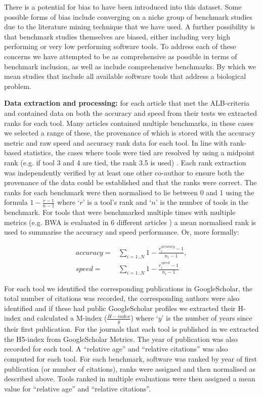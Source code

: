 \documentclass[fleqn,10pt]{SelfArx} %
\begin{document}
There is a potential for bias to have been introduced into this
dataset. Some possible forms of bias include converging on a niche
group of benchmark studies due to the literature mining technique that
we have used. A further possibility is that benchmark studies
themselves are biased, either including very high performing or very
low performing software tools. To address each of these concerns we
have attempted to be as comprehensive as possible in terms of
benchmark inclusion, as well as include comprehensive benchmarks. By
which we mean studies that include all available software tools that
address a biological problem.

\textbf{Data extraction and processing:} for each article that met the
ALB-criteria and contained data on both the accuracy and speed from
their tests we extracted ranks for each tool. Many articles contained
multiple benchmarks, in these cases we selected a range of these, the
provenance of which is stored with the accuracy metric and raw speed
and accuracy rank data for each tool. In line with rank-based
statistics, the cases where tools were tied are resolved by using a
midpoint rank (e.g. if tool 3 and 4 are tied, the rank 3.5 is used)
\cite{Mann1947-re}. Each rank extraction was independently verified by
at least one other co-author to ensure both the provenance of the data
could be established and that the ranks were correct. The ranks for
each benchmark were then normalised to lie between 0 and 1 using the
formula $1-\frac{r-1}{n-1}$ where ‘$r$’ is a tool’s rank and ‘$n$’ is the
number of tools in the benchmark. For tools that were benchmarked
multiple times with multiple metrics (e.g. BWA is evaluated in 6
different articles
\cite{Bao2011-lv,Caboche2014-lj,Hatem2013-cs,Schbath2012-ob,Ruffalo2011-rl,Holtgrewe2011-fd})
a mean normalised rank is used to summarise the accuracy and speed performance. 
Or, more formally:
 
\begin{equation*}
\begin{split}
accuracy =& \sum_{i=1..N} 1-\frac{r^{accuracy}_i-1}{n_i-1}, \\
speed    =& \sum_{i=1..N} 1-\frac{r^{speed   }_i-1}{n_i-1}
\end{split}
\end{equation*}
 
For each tool we identified the corresponding publications in
GoogleScholar, the total number of citations was recorded, the
corresponding authors were also identified and if these had public
GoogleScholar profiles we extracted their H-index and calculated a
M-index ($\frac{H-index}{y}$) where ‘$y$’ is the number of years since
their first publication. For the journals that each tool is published
in we extracted the H5-index
from GoogleScholar Metrics. The year of publication was also recorded for each
tool. A “relative age” and “relative citations” was also computed for
each tool. For each benchmark, software was ranked by year of first
publication (or number of citations), ranks were assigned and then
normalised as described above. Tools ranked in multiple evaluations
were then assigned a mean value for “relative age” and “relative
citations”.
\end{document}
